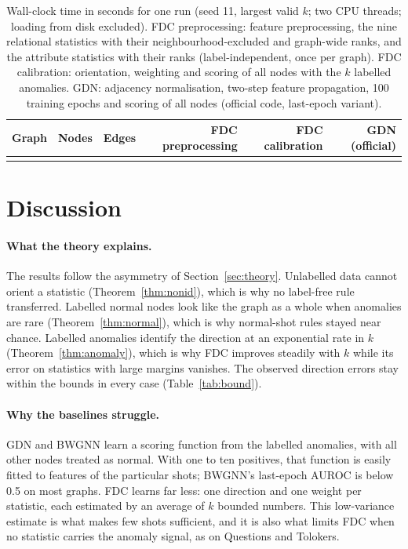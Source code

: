 \documentclass[pdflatex,sn-mathphys-ay]{sn-jnl}
\theoremstyle{plain}
\theoremstyle{remark}
\begin{document}
\begin{table}[!ht]
\caption{Wall-clock time in seconds for one run (seed 11, largest valid $k$; two CPU threads; loading from disk excluded). FDC preprocessing: feature preprocessing, the nine relational statistics with their neighbourhood-excluded and graph-wide ranks, and the attribute statistics with their ranks (label-independent, once per graph). FDC calibration: orientation, weighting and scoring of all nodes with the $k$ labelled anomalies. GDN: adjacency normalisation, two-step feature propagation, 100 training epochs and scoring of all nodes (official code, last-epoch variant).}
\label{tab:runtime}
\footnotesize
\begin{tabular*}{\textwidth}{@{\extracolsep{\fill}}lrrrrr@{}}
\toprule
Graph & Nodes & Edges & FDC preprocessing & FDC calibration & GDN (official) \\
\midrule

\botrule
\end{tabular*}
\end{table}

\section{Discussion}\label{sec:discussion}

\paragraph{What the theory explains.} The results follow the asymmetry of Section~\ref{sec:theory}. Unlabelled data cannot orient a statistic (Theorem~\ref{thm:nonid}), which is why no label-free rule transferred. Labelled normal nodes look like the graph as a whole when anomalies are rare (Theorem~\ref{thm:normal}), which is why normal-shot rules stayed near chance. Labelled anomalies identify the direction at an exponential rate in $k$ (Theorem~\ref{thm:anomaly}), which is why FDC improves steadily with $k$ while its error on statistics with large margins vanishes. The observed direction errors stay within the bounds in every case (Table~\ref{tab:bound}).

\paragraph{Why the baselines struggle.} GDN and BWGNN learn a scoring function from the labelled anomalies, with all other nodes treated as normal. With one to ten positives, that function is easily fitted to features of the particular shots; BWGNN's last-epoch AUROC is below 0.5 on most graphs. FDC learns far less: one direction and one weight per statistic, each estimated by an average of $k$ bounded numbers. This low-variance estimate is what makes few shots sufficient, and it is also what limits FDC when no statistic carries the anomaly signal, as on Questions and Tolokers.
\end{document}
